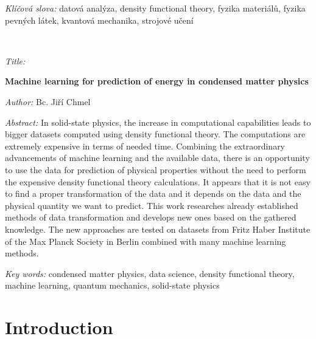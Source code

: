 \documentclass[11pt,oneside,czech,american]{book} %
\theoremstyle{definition} %
\theoremstyle{definition}
\begin{document}
\bigskip{}

\noindent \emph{Klíčová slova:} datová analýza, density functional theory, fyzika materiálů, fyzika pevných látek, kvantová mechanika, strojové učení

%
\vfill{}
~

\begin{onehalfspace}
	\noindent \emph{Title:}
	
	\noindent \textbf{Machine learning for prediction of energy in condensed matter physics}
\end{onehalfspace}

\bigskip{}

\noindent \emph{Author:} Bc. Jiří Chmel

\bigskip{}

\noindent \emph{Abstract:} In solid-state physics, the increase in computational capabilities leads to bigger datasets computed using density functional theory. The computations are extremely expensive in terms of needed time. Combining the extraordinary advancements of machine learning and the available data, there is an opportunity to use the data for prediction of physical properties without the need to perform the expensive density functional theory calculations. It appears that it is not easy to find a proper transformation of the data and it depends on the data and the physical quantity we want to predict. This work researches already established methods of data transformation and develops new ones based on the gathered knowledge. The new approaches are tested on datasets from Fritz Haber Institute of the Max Planck Society in Berlin combined with many machine learning methods.

\bigskip{}

\noindent \emph{Key words:} condensed matter physics, data science, density functional theory, machine learning, quantum mechanics, solid-state physics

\newpage{}

\pagestyle{plain}

\tableofcontents{}

\newpage{}

\chapter*{Introduction}

\end{document}
